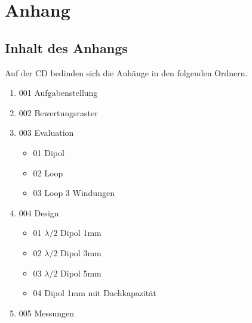 \chapter{Anhang}
\section{Inhalt des Anhangs}
Auf der CD bedinden sich die Anhänge in den folgenden Ordnern.
\begin{enumerate}
\item[] 001 Aufgabenstellung
\item[] 002 Bewertungsraster
\item[] 003 Evaluation
	\begin{itemize}
		\item[] 01 Dipol
		\item[] 02 Loop
		\item[] 03 Loop 3 Windungen
	\end{itemize}
\item[] 004 Design
	\begin{itemize}
		\item[] 01 $\lambda/2$ Dipol 1mm
		\item[] 02 $\lambda/2$ Dipol 3mm
		\item[] 03 $\lambda/2$ Dipol 5mm
		\item[] 04 Dipol 1mm mit Dachkapazität
	\end{itemize}

\item[] 005 Messungen
\end{enumerate}